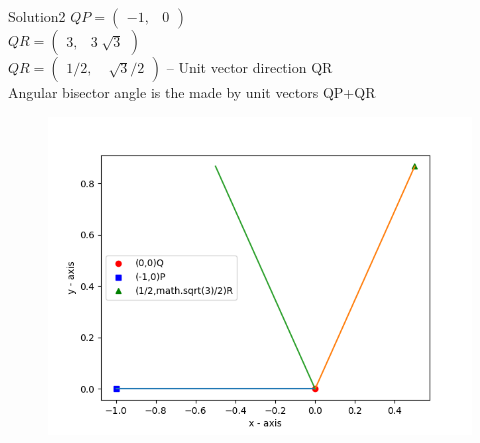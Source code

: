 \documentclass{beamer}
\begin{document}
\begin{frame}{Solution2}
$ QP = \begin{pmatrix}
    -1  ,& 0
              \end{pmatrix} $ \\[5.00mm]  $
              QR = \begin{pmatrix}
    3 ,& 3 \sqrt[]{3}
     \end{pmatrix}
 $ \\[5.00mm] 
 $
  QR = \begin{pmatrix}
    1/2 ,&\sqrt[]{3} /2
     \end{pmatrix}
 $ -- Unit vector direction QR \\[3.00mm]
 Angular bisector angle is the made by unit vectors QP+QR
 \begin{figure}
   \includegraphics[scale=0.4]{Figure_2.png}
\end{figure}



\end{frame}
\end{document}
